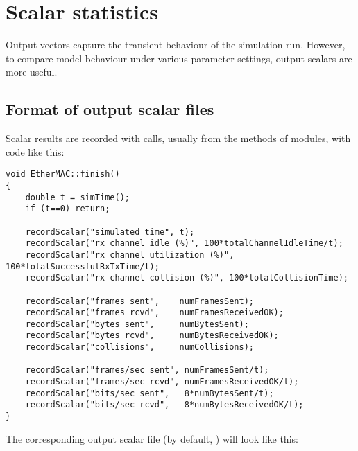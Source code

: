\section{Scalar statistics}
\label{sec:ch-ana-sim:output-scalars}

Output vectors capture the transient behaviour of the simulation run.
However, to compare model behaviour under various parameter settings,
output scalars are more useful.

\subsection{Format of output scalar files}

Scalar results are recorded with  calls,
usually from the  methods of modules, with code like this:

\begin{verbatim}
void EtherMAC::finish()
{
    double t = simTime();
    if (t==0) return;

    recordScalar("simulated time", t);
    recordScalar("rx channel idle (%)", 100*totalChannelIdleTime/t);
    recordScalar("rx channel utilization (%)", 100*totalSuccessfulRxTxTime/t);
    recordScalar("rx channel collision (%)", 100*totalCollisionTime);

    recordScalar("frames sent",    numFramesSent);
    recordScalar("frames rcvd",    numFramesReceivedOK);
    recordScalar("bytes sent",     numBytesSent);
    recordScalar("bytes rcvd",     numBytesReceivedOK);
    recordScalar("collisions",     numCollisions);

    recordScalar("frames/sec sent", numFramesSent/t);
    recordScalar("frames/sec rcvd", numFramesReceivedOK/t);
    recordScalar("bits/sec sent",   8*numBytesSent/t);
    recordScalar("bits/sec rcvd",   8*numBytesReceivedOK/t);
}
\end{verbatim}

The corresponding output scalar file (by default, )
will look like this:

